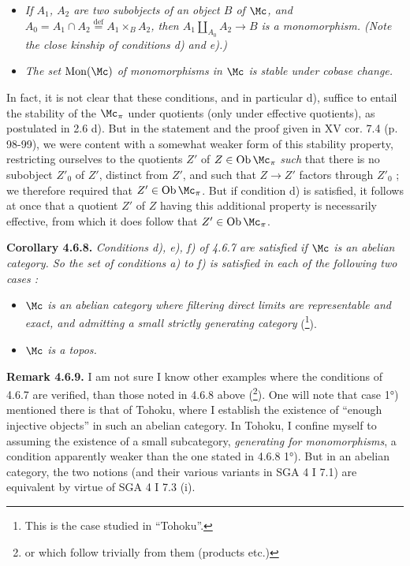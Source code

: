 \begin{itemize}[leftmargin=4em]
\item[\textit{e)}] \textit{If $A_1$, $A_2$ are two subobjects of an object $B$ of $\Mc$, and $A_0 = A_1 \cap A_2 \overset{\text{def}}{=} A_1 \times_B A_2$, then $A_1 \amalg_{A_0} A_2 \longrightarrow B$ is a monomorphism. (Note the close kinship of conditions d) and e).)}
\item[\textit{f)}] \textit{The set} $\mathrm{Mon}(\Mc)$ \textit{of monomorphisms in $\Mc$ is stable under cobase change.}
\end{itemize}
In fact, it is not clear that these conditions, and in particular d), suffice to entail the stability of the $\Mc_{\pi}$ under quotients (only under effective quotients), as postulated in 2.6 d). But in the statement and the proof given in XV cor. 7.4 (p. 98-99), we were content with a somewhat weaker form of this stability property, restricting ourselves to the quotients $Z'$ of $Z \in \mathrm{Ob}\,\Mc_{\pi}$ \textit{such} that there is no subobject $Z'_0$ of $Z'$, distinct from $Z'$, and such that $Z \longrightarrow Z'$ factors through $Z'_0$ ; we therefore required that $Z' \in \mathrm{Ob}\,\Mc_{\pi}$. But if condition d) is satisfied, it follows at once that a quotient $Z'$ of $Z$ having this additional property is necessarily effective, from which it does follow that $Z' \in \mathrm{Ob}\,\Mc_{\pi}$.


\textbf{Corollary 4.6.8.} \textit{Conditions d), e), f) of 4.6.7 are satisfied if $\Mc$ is an abelian category. So the set of conditions a) to f) is satisfied in each of the following two cases :}
\begin{itemize}[leftmargin=4em]
\item[\textit{1)}] \textit{$\Mc$ is an abelian category where filtering direct limits are representable and exact, and admitting a small strictly generating category} (\footnote[63]{This is the case studied in ``Tohoku''.}).
\item[\textit{2)}] \textit{$\Mc$ is a topos.}
\end{itemize}
\textbf{Remark 4.6.9.} I am not sure I know other examples where the conditions of 4.6.7 are verified, than those noted in 4.6.8 above (\footnote[64]{or which follow trivially from them (products etc.)}). One will note that case 1°) mentioned there is that of Tohoku, where I establish the existence of ``enough injective objects'' in such an abelian category. In Tohoku, I confine myself to assuming the existence of a small subcategory, \textit{generating for monomorphisms}, a condition apparently weaker than the one stated in 4.6.8 1°). But in an abelian category, the two notions (and their various variants in SGA 4 I 7.1) are equivalent by virtue of SGA 4 I 7.3 (i). %

